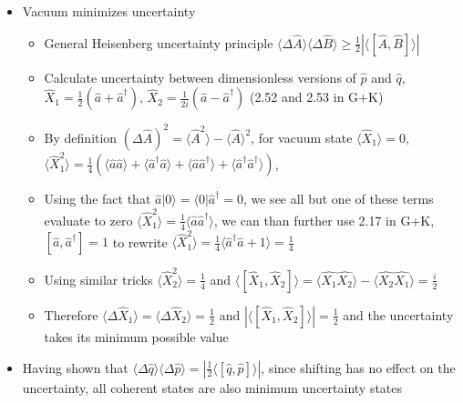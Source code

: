 \documentclass[english]{article}
\newcommand{\bra}[1]{\langle#1 |}
\newcommand{\ket}[1]{|#1 \rangle}
\newcommand{\average}[1]{\langle #1 \rangle}
\begin{document}
\begin{itemize}
\begin{itemize}
\begin{equation}
\hat{H}=\omega^2\hat{q}_s^2-2\hat{q}\omega^2 q_d -(q_d)^2+\hat{p}_s^2-2\hat{p}p_d -(p_d)^2
\end{equation}
\item For displaced state (which we secretly know are coherent states) $\ket{\psi_D}$; $(\omega^2\hat{q}_s^2+\hat{p}_s^2)\ket{\psi_D}=\frac{\hbar \omega}{2}\ket{\psi_D}$ therefore $\hat{H}\ket{\psi_D}=(2\hat{p} p_d+2 \hat{q} \omega^2 q_d+\mathrm{const.})\ket{\psi_D}$ where the constant part is irrelevant because it only contributes a global phase, applying $\exp(-i\hat{H}\delta t)$ where $\delta t$ is a short amount of time will lead to a shift in $q$ proportional to $\Delta p$ and a shift in $p$ proportional to $\Delta q$, which are the equations of motion on a classical harmonic oscillator (and in turn the equations of motion for a classical EM field) 
\end{itemize}
\item Vacuum minimizes uncertainty
\begin{itemize}
\item General Heisenberg uncertainty principle $\average{\Delta \hat{A}} \average{\Delta \hat{B}}\ge \frac{1}{2}|\average{[\hat{A},\hat{B}]} |$
\item Calculate uncertainty between dimensionless versions of $\hat{p}$ and $\hat{q}$, $\hat{X}_1=\frac{1}{2}(\hat{a}+\hat{a}^\dagger)$, $\hat{X}_2=\frac{1}{2i}(\hat{a}-\hat{a}^\dagger)$ (2.52 and 2.53 in G+K)
\item By definition $(\Delta \hat{A})^2=\average{\hat{A}^2}-\average{\hat{A}}^2$, for vacuum state $\average{\hat{X}_1}=0$, $\average{\hat{X}^2_1}=\frac{1}{4}(\average{\hat{a}\hat{a}}+\average{\hat{a}^\dagger\hat{a}}+\average{\hat{a}\hat{a}^\dagger}+\average{\hat{a}^\dagger\hat{a}^\dagger})$, 
\item Using the fact that $\hat{a}\ket{0}=\bra{0}\hat{a}^\dagger=0$, we see all but one of these terms evaluate to zero $\average{\hat{X}^2_1}=\frac{1}{4}\average{\hat{a}\hat{a}^\dagger}$, we can than further use 2.17 in G+K, $[\hat{a},\hat{a}^\dagger]=1$ to rewrite $\average{\hat{X}^2_1}=\frac{1}{4}\average{\hat{a}^\dagger\hat{a}+1}=\frac{1}{4}$
\item Using similar tricks $\average{\hat{X}^2_2}=\frac{1}{4}$ and $\average{[\hat{X}_1,\hat{X}_2]}=\average{\hat{X_1}\hat{X_2}}-\average{\hat{X_2}\hat{X_1}}=\frac{i}{2}$
\item Therefore $\average{\Delta \hat{X}_1}=\average{\Delta \hat{X}_2}=\frac{1}{2}$ and $|\average{[\hat{X}_1,\hat{X}_2]}|=\frac{1}{2}$ and the uncertainty takes its minimum possible value
\end{itemize}
\item Having shown that $\average{\Delta \hat{q}}\average{\Delta \hat{p}}=|\frac{1}{2}\average{[\hat{q},\hat{p}]}|$, since shifting has no effect on the uncertainty, all coherent states are also minimum uncertainty states
\end{itemize}
\end{document}
